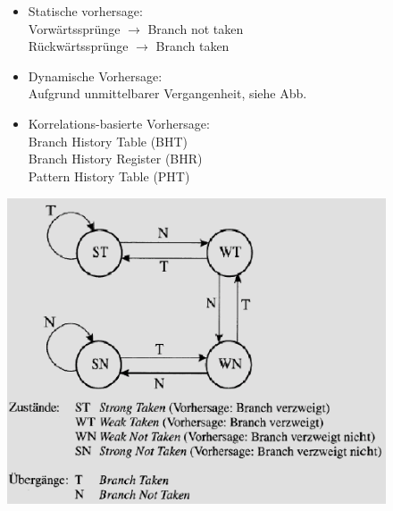\begin{figure}[htbp]
	
	\begin{minipage}{0.55\textwidth}
		\begin{itemize}[noitemsep,topsep=0pt]
			\item Statische vorhersage:\\
			 Vorwärtssprünge $\rightarrow$ Branch not taken\\ Rückwärtssprünge $\rightarrow$ Branch taken
			 
			 \item Dynamische Vorhersage:\\
			 Aufgrund unmittelbarer Vergangenheit, siehe Abb.
			 
			 \item Korrelations-basierte Vorhersage:\\
			 Branch History Table (BHT)\\
			 Branch History Register (BHR)\\
			 Pattern History Table (PHT)

		\end{itemize}
			
		
	\end{minipage}
	\hfill		
	\begin{minipage}{0.4\textwidth} 
		\includegraphics[width=\textwidth]{images/Rechnerarchitekturen/Sprungvorhersage.PNG}
	\end{minipage}
	
\end{figure}

